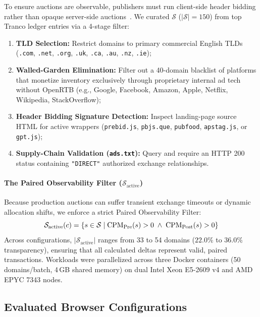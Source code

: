 To ensure auctions are observable, publishers must run client-side header bidding rather than opaque server-side auctions~\cite{pachilakis2019no, cook2020inferring}. 
We curated $\mathcal{S}$ ($|\mathcal{S}| = 150$) from top Tranco ledger entries via a 4-stage filter:
\begin{enumerate}
    \item \textbf{TLD Selection:} Restrict domains to primary commercial English TLDs (\texttt{.com}, \texttt{.net}, \texttt{.org}, \texttt{.uk}, \texttt{.ca}, \texttt{.au}, \texttt{.nz}, \texttt{.ie});
    \item \textbf{Walled-Garden Elimination:} Filter out a 40-domain blacklist of platforms that monetize inventory exclusively through proprietary internal ad tech without OpenRTB (e.g., Google, Facebook, Amazon, Apple, Netflix, Wikipedia, StackOverflow);
    \item \textbf{Header Bidding Signature Detection:} Inspect landing-page source HTML for active wrappers (\texttt{prebid.js}, \texttt{pbjs.que}, \texttt{pubfood}, \texttt{apstag.js}, or \texttt{gpt.js});
    \item \textbf{Supply-Chain Validation (\texttt{ads.txt}):} Query  and require an HTTP 200 status containing \texttt{"DIRECT"} authorized exchange relationships.
\end{enumerate}

\paragraph{The Paired Observability Filter ($\mathcal{S}_{\text{active}}$)}
Because production auctions can suffer transient exchange timeouts or dynamic allocation shifts, we enforce a strict Paired Observability Filter:
\begin{equation}
\mathcal{S}_{\text{active}}(c) = \left\{ s \in \mathcal{S} \;\middle|\; \text{CPM}_{\text{Pre}}(s) > 0 \;\land\; \text{CPM}_{\text{Post}}(s) > 0 \right\}
\end{equation}
Across configurations, $|\mathcal{S}_{\text{active}}|$ ranges from 33 to 54 domains ($22.0\%$ to $36.0\%$ transparency), ensuring that all calculated deltas represent valid, paired transactions. 
Workloads were parallelized across three Docker containers (50 domains/batch, 4\,GB shared memory) on dual Intel Xeon E5-2609 v4 and AMD EPYC 7343 nodes.

\subsection{Evaluated Browser Configurations}
\label{subsec:browser_matrix}

